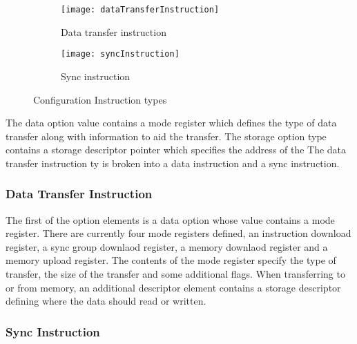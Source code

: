 \begin{figure}
\centering
  \begin{subfigure}{.85\textwidth}
    \centering
    \mbox{\texttt{[image: dataTransferInstruction]}}
    \captionsetup{justification=centering, skip=6pt}
    \caption{Data transfer instruction }
    \label{fig:Data transfer instruction}
  \end{subfigure}%

\bigskip

  \vspace{-35pt}
  \begin{subfigure}{0.85\textwidth}
    \centering
    \vspace{40pt}
    \texttt{[image: syncInstruction]}
    \captionsetup{justification=centering, skip=10pt}
    \caption{Sync instruction }
    \label{fig:Sync instruction}
  \end{subfigure}%
\captionsetup{justification=centering, skip=16pt}
\caption{Configuration Instruction types}
\label{fig:Configuration Instruction types}
\end{figure}

The data option value contains a mode register \cite{micron_ddr3} which defines the type of data transfer along with information to aid the transfer. The storage option type contains a storage descriptor pointer which specifies the address of the 
The data transfer instruction ty is broken into a data instruction and a sync instruction.

\subsubsection{Data Transfer Instruction}
\label{sec:Data Transfer Instruction}

The first of the option elements is a data option whose value contains a mode register.
There are currently four mode registers defined, an instruction download register, a sync group downlaod register, a memory downlaod register and a memory upload register.
The contents of the mode register specify the type of transfer, the size of the transfer and some additional flags.
When transferring to or from memory, an additional descriptor element contains a storage descriptor defining where the data should read or written.

\subsubsection{Sync Instruction}
\label{sec:Data Transfer Instruction}

